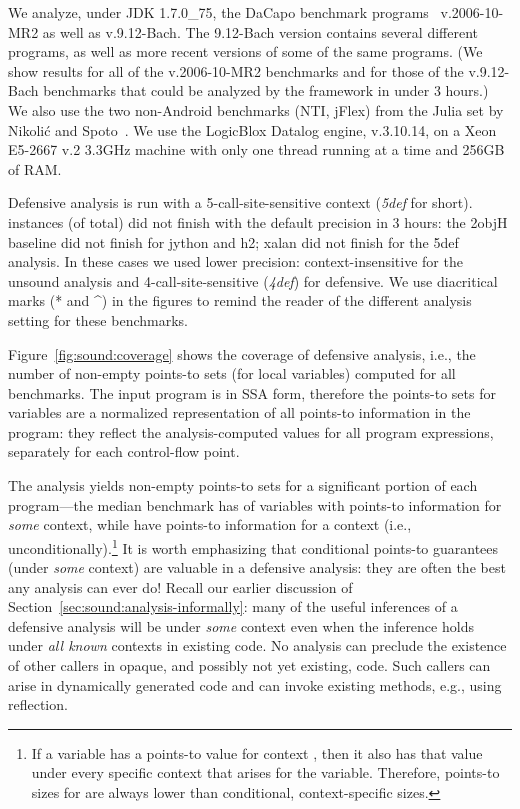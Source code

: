 We analyze, under JDK 1.7.0\_75, the DaCapo benchmark programs~\cite{oopsla:2006:Blackburn} v.2006-10-MR2 as well as v.9.12-Bach. The 9.12-Bach version contains several different programs, as well as more recent versions of some of the same programs. (We show results for all of the v.2006-10-MR2 benchmarks and for those of the v.9.12-Bach benchmarks that could be analyzed by the \doop{} framework in under 3 hours.) We also use the two non-Android benchmarks (NTI, jFlex) from the Julia set by Nikoli\'{c} and Spoto~\cite{ictac:2012:Nikolic}. We use the LogicBlox Datalog engine, v.3.10.14, on a Xeon E5-2667 v.2 3.3GHz machine with only one thread running at a time and 256GB of RAM.

Defensive analysis is run with a 5-call-site-sensitive context (\emph{5def} for short).  instances (of  total) did not finish with the default precision in 3 hours: the 2objH baseline did not finish for jython and h2; xalan did not finish for the 5def analysis. In these cases we used lower precision: context-insensitive for the unsound analysis and 4-call-site-sensitive (\emph{4def}) for defensive. We use diacritical marks (* and \^{}) in the figures to remind the reader of the different analysis setting for these benchmarks.


Figure~\ref{fig:sound:coverage} shows the coverage of defensive analysis, i.e., the number of non-empty points-to sets (for local variables) computed for all benchmarks. The input program is in SSA form, therefore the points-to sets for variables are a normalized representation of all points-to information in the program: they reflect the analysis-computed values for all program expressions, separately for each control-flow point.

The analysis yields non-empty points-to sets for a significant portion of each program---the median benchmark has  of variables with points-to information for \emph{some} context, while  have points-to information for a context \ctxInit{} (i.e., unconditionally).\footnote{If a variable has a points-to value for context \ctxInit{}, then it also has that value under every specific context that arises for the variable. Therefore, points-to sizes for \ctxInit{} are always lower than conditional, context-specific sizes.} It is worth emphasizing that conditional points-to guarantees (under \emph{some} context) are valuable in a defensive analysis: they are often the best any analysis can ever do! Recall our earlier discussion of Section~\ref{sec:sound:analysis-informally}: many of the useful inferences of a defensive analysis will be under \emph{some} context even when the inference holds under \emph{all known} contexts in existing code. No analysis can preclude the existence of other callers in opaque, and possibly not yet existing, code. Such callers can arise in dynamically generated code and can invoke existing methods, e.g., using reflection.

